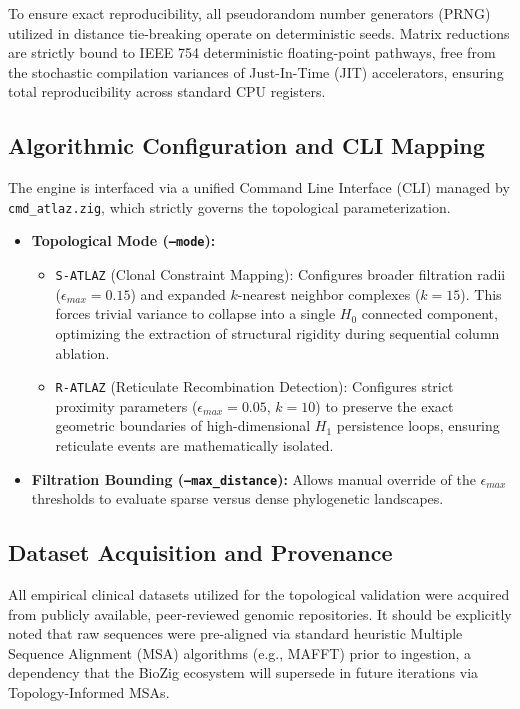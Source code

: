 To ensure exact reproducibility, all pseudorandom number generators (PRNG) utilized in distance tie-breaking operate on deterministic seeds. Matrix reductions are strictly bound to IEEE 754 deterministic floating-point pathways, free from the stochastic compilation variances of Just-In-Time (JIT) accelerators, ensuring total reproducibility across standard CPU registers.

\subsection{Algorithmic Configuration and CLI Mapping}
The engine is interfaced via a unified Command Line Interface (CLI) managed by \texttt{cmd\_atlaz.zig}, which strictly governs the topological parameterization. 
\begin{itemize}
    \item \textbf{Topological Mode (\texttt{--mode}):} 
    \begin{itemize}
        \item \texttt{S-ATLAZ} (Clonal Constraint Mapping): Configures broader filtration radii ($\epsilon_{max} = 0.15$) and expanded $k$-nearest neighbor complexes ($k=15$). This forces trivial variance to collapse into a single $H_0$ connected component, optimizing the extraction of structural rigidity during sequential column ablation.
        \item \texttt{R-ATLAZ} (Reticulate Recombination Detection): Configures strict proximity parameters ($\epsilon_{max} = 0.05$, $k=10$) to preserve the exact geometric boundaries of high-dimensional $H_1$ persistence loops, ensuring reticulate events are mathematically isolated.
    \end{itemize}
    \item \textbf{Filtration Bounding (\texttt{--max\_distance}):} Allows manual override of the $\epsilon_{max}$ thresholds to evaluate sparse versus dense phylogenetic landscapes.
\end{itemize}

\subsection{Dataset Acquisition and Provenance}
All empirical clinical datasets utilized for the topological validation were acquired from publicly available, peer-reviewed genomic repositories. It should be explicitly noted that raw sequences were pre-aligned via standard heuristic Multiple Sequence Alignment (MSA) algorithms (e.g., MAFFT) prior to ingestion, a dependency that the BioZig ecosystem will supersede in future iterations via Topology-Informed MSAs.


